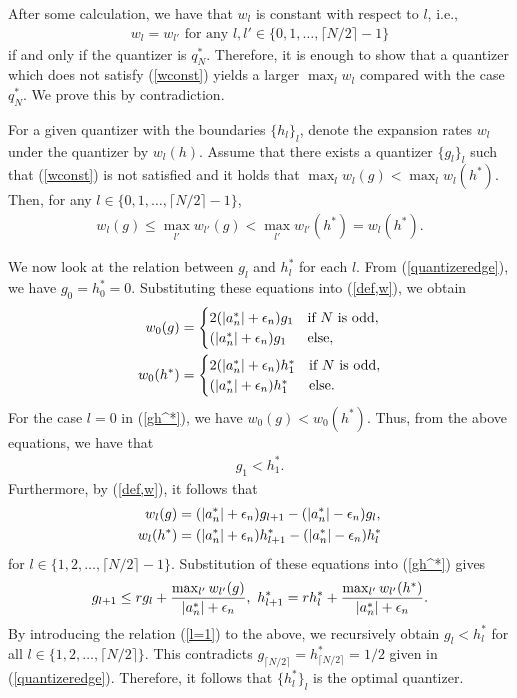 \documentclass[a4paper, 11pt]{article}
\makeatletter
\theoremstyle{definition}
\newenvironment{pf}[1][\proofname]{\par\pushQED{\qed}
 \normalfont\topsep6\p@\@plus6\p@\relax\trivlist\item[\hskip\labelsep\bfseries#1\@addpunct{.}]
 \ignorespaces}{\popQED\endtrivlist\@endpefalse}
\makeatother
\begin{document}
\begin{pf}[Proof of Lemma~\ref{lem,opt_q}]
After some calculation, we have that $w_l$ is constant with respect to $l$,
i.e.,
\begin{align}
 w_l=w_{l'}\text{ for any } l,l'\in\{0,1,\dots,\lceil N/2\rceil-1\}\label{wconst}
\end{align}
if and only if the quantizer is $q^*_N$.
Therefore, it is enough to show that a quantizer which does not satisfy
(\ref{wconst}) yields a larger $\max_lw_l$ compared with the case $q^*_N$.
We prove this by contradiction.

For a given quantizer with the boundaries $\{h_l\}_l$,
denote the expansion rates $w_l$ under the quantizer by $w_l(h)$.
Assume that there exists a quantizer $\{g_l\}_l$ such that (\ref{wconst}) is
not satisfied and it holds that $ \max_{l}w_{l}(g)<\max_{l}w_{l}(h^*)$.
Then, for any $l\in\{0,1,\dots,\lceil N/2\rceil-1\}$,
\begin{align}
 w_{l}(g)\leq \max_{l'}w_{l'}(g)<\max_{l'}w_{l'}(h^*)=w_{l}(h^*).\label{gh^*}
\end{align}

We now look at the relation between $g_{l}$ and $h_{l}^*$ for each $l$.
From (\ref{quantizeredge}), we have $g_0=h^*_0=0$.
Substituting these equations into (\ref{def,w}), we obtain
\begin{align}
 w_0(g)&=\begin{cases}
 2(|a_n^*|+\epsilon_n)g_1 & \text{if }N\text{ is odd},\\
 (|a_n^*|+\epsilon_n)g_1  & \text{else},
\end{cases}\notag\\
 w_0(h^*)&=\begin{cases}
 2(|a_n^*|+\epsilon_n)h^*_1 & \text{if }N\text{ is odd},\\
 (|a_n^*|+\epsilon_n)h^*_1  & \text{else}.
\end{cases}\notag
\end{align}
For the case $l=0$ in (\ref{gh^*}), we have $w_0(g)<w_0(h^*)$.
Thus, from the above equations, we have that
\begin{align}
 g_1<h_1^*.\label{l=1}
\end{align}
Furthermore, by (\ref{def,w}), it follows that
\begin{align}
 w_{l}(g)&=(|a_n^*|+\epsilon_n)g_{l+1}-(|a_n^*|-\epsilon_n)g_{l},\notag\\
 w_{l}(h^*)&=(|a_n^*|+\epsilon_n)h^*_{l+1}-(|a_n^*|-\epsilon_n)h^*_{l}\notag
\end{align}
for $l\in\{1,2,\dots,\lceil N/2\rceil-1\}$.
Substitution of these equations into (\ref{gh^*}) gives
\begin{align}
 g_{l+1}\leq rg_{l}+\frac{\max_{l'}w_{l'}(g)}{|a_n^*|+\epsilon_n},\
 h^*_{l+1}=rh^*_{l}+\frac{\max_{l'}w_{l'}(h^*)}{|a_n^*|+\epsilon_n}.\notag
\end{align}
By introducing the relation (\ref{l=1}) to the above, we recursively obtain
$g_{l}<h^*_{l}$ for all $l\in\{1,2,\dots,\lceil N/2\rceil\}$.
This contradicts $g_{\lceil N/2\rceil}=h^*_{\lceil N/2\rceil}=1/2$
given in (\ref{quantizeredge}). Therefore, it follows that $\{h_l^*\}_l$
is the optimal quantizer.
\end{pf}
\end{document}
